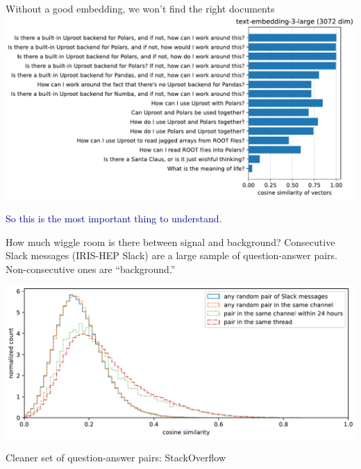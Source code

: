 \documentclass[aspectratio=169]{beamer}
\begin{document}
\begin{frame}{Without a good embedding, we won't find the right documents}
\vspace{0.5 cm}
\includegraphics[width=\linewidth]{PLOTS/experiments-with-similarity.pdf}

\vspace{-0.75 cm}
\textcolor{darkblue}{So this is the most important thing to understand.}
\vspace{0.75 cm}
\end{frame}

\begin{frame}{How much wiggle room is there between signal and background?}
\large
\vspace{0.5 cm}
Consecutive Slack messages (IRIS-HEP Slack) are a large sample of question-answer pairs. Non-consecutive ones are ``background.''

\vspace{0.25 cm}
\includegraphics[width=\linewidth]{PLOTS/slack-similarity-in-and-out-of-threads.pdf}
\end{frame}

\begin{frame}{Cleaner set of question-answer pairs: StackOverflow}
\vspace{0.25 cm}
\begin{center}
\end{center}
\end{frame}
\end{document}
